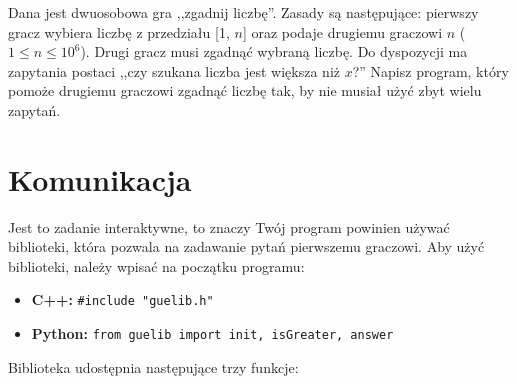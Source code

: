 \documentclass{spiral}
\begin{document}
  \makeheader

  Dana jest dwuosobowa gra ,,zgadnij liczbę''. Zasady są następujące:
  pierwszy gracz wybiera liczbę z przedziału [1, $n$]
  oraz podaje drugiemu graczowi $n$ ($1 \leq n \leq 10^6$).
  Drugi gracz musi zgadnąć wybraną liczbę. 
  Do dyspozycji ma zapytania postaci ,,czy szukana liczba jest większa niż $x$?''
  Napisz program, który pomoże drugiemu graczowi zgadnąć liczbę tak,
  by nie musiał użyć zbyt wielu zapytań.

  \section{Komunikacja}
    Jest to zadanie interaktywne,
    to znaczy Twój program powinien używać biblioteki,
    która pozwala na zadawanie pytań pierwszemu graczowi.
    Aby użyć biblioteki, należy wpisać na początku programu:
    \begin{itemize}
        \item \textbf{C++:}
            \verb|#include "guelib.h"|

        \item \textbf{Python:}
            \texttt{from guelib import init, isGreater, answer}
    \end{itemize}
    Biblioteka udostępnia następujące trzy funkcje:
\end{document}
